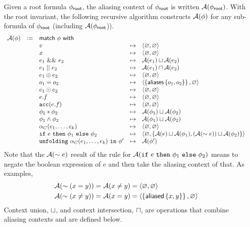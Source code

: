 Given a root formula $\phi_\textsf{root}$, the aliasing context of $\phi_\textsf{root}$ is written $\mathcal{A}(\phi_\textsf{root})$. With the root invariant, the following recursive algorithm constructs $\mathcal{A}(\phi)$ for any sub-formula of $\phi_\textsf{root}$ (including $\mathcal{A}(\phi_\textsf{root}$)).
%
\begin{align*}
\begin{array}{rclcl}
\A(\phi) &:=& \tsf{match} \ \phi \ \tsf{with} \\
&& v &\mt&
  \context{\empty}{\empty}
\\
&& x &\mt&
  \context{\empty}{\empty}
\\
&& e_1 \ \band \ e_2 &\mt&
  \A(e_1) \contextunion \A(e_2)
\\
&& e_1 \bor e_2 &\mt&
  \A(e_1) \contextintersection \A(e_2)
\\
&& e_1 \oplus e_2 &\mt&
  \context{\empty}{\empty}
\\
&& o_1 = o_2 &\mt&
  \context{\set{\aliases\set{o_1, o_2}}}{\empty} %
\\
&& e_1 \odot e_2 &\mt&
  \context{\empty}{\empty}
\\
&& e.f &\mt&
  \context{\empty}{\empty}
\\
&& \cacc(e.f) &\mt&
  \context{\empty}{\empty}
\\
&& \phi_1 \ast \phi_2 &\mt&
  \A(\phi_1) \contextunion \A(\phi_2)
\\
&& \phi_1 \land \phi_2 &\mt&
  \A(\phi_1) \contextunion \A(\phi_2)
\\
&& \alpha_C(e_1, \dots, e_k) &\mt&
  \context{\empty}{\empty}
\\
&& \cif \ e \ \cthen \ \phi_1 \ \celse \ \phi_2 &\mt&
  \context{\empty}{\set{ \A(e) \contextunion \A(\phi_1), (\A(\pnot e)) \contextunion \A(\phi_2) }}
\\
&& \cunfolding \ \alpha_C(e_1, \dots, e_k) \ \cin \ \phi\p &\mt&
  \A(\phi\p)
\end{array}
\end{align*}
%
Note that the $\mathcal{A}(\sim e)$ result of the rule for $\mathcal{A}(\texttt{if} \ e \ \texttt{then} \ \phi_1 \ \texttt{else} \ \phi_2)$ means to negate the boolean expression of $e$ and then take the aliasing context of that. As examples,
\begin{align*}
  \mathcal{A}( \sim (x =   y) ) = & \ \mathcal{A}(x \neq y) = \langle \varnothing, \varnothing \rangle \\
  \mathcal{A}( \sim (x\neq y) ) = & \ \mathcal{A}(x =    y) = \langle \left\{  \textsf{aliased}\left\{ x,y \right\}  \right\}, \varnothing \rangle
\end{align*}
Context union, $\sqcup$, and context intersection, $\sqcap$, are operations that combine aliasing contexts and are defined below.
